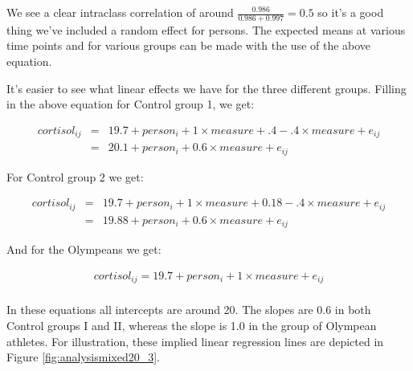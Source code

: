\documentclass[]{report}\usepackage[]{graphicx}\usepackage[]{color}
\begin{document}
We see a clear intraclass correlation of around $\frac{0.986}{0.986+0.997}= 0.5 $ so it's a good thing we've included a random effect for persons. The expected means at various time points and for various groups can be made with the use of the above equation. 

It's easier to see what linear effects we have for the three different groups. Filling in the above equation for Control group 1, we get:

\begin{eqnarray}
cortisol_{ij} &=& 19.7 + person_i + 1 \times measure + .4    -.4  \times measure +   e_{ij} \nonumber \\
               &=&  20.1 + person_i +0.6 \times measure +   e_{ij} \nonumber
\end{eqnarray}

For Control group 2 we get:

\begin{eqnarray}
cortisol_{ij} &=& 19.7 + person_i + 1 \times measure  + 0.18  - .4  \times measure+   e_{ij} \nonumber \\
        &=&   19.88 + person_i   + 0.6 \times measure    +   e_{ij}    \nonumber
\end{eqnarray}

And for the Olympeans we get:

\begin{eqnarray}
cortisol_{ij} = 19.7 + person_i + 1 \times measure  +   e_{ij} \nonumber \\
\end{eqnarray}


In these equations all intercepts are around 20. The slopes are 0.6 in both Control groups I and II, whereas the slope is 1.0 in the group of Olympean athletes. For illustration, these implied linear regression lines are depicted in Figure \ref{fig:analysismixed20_3}. 
\end{document}
